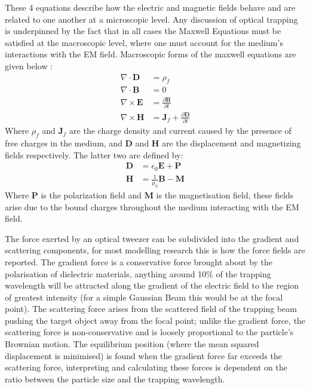 These 4 equations describe how the electric and magnetic fields behave and are related to one another at a microscopic level. Any discussion of optical trapping is underpinned by the fact that in all cases the Maxwell Equations must be satisfied at the macroscopic level, where one must account for the medium's interactions with the EM field. Macroscopic forms of the maxwell equations are given below \cite{Jackson_1975}:
\begin{align}
	\nabla \cdot \mathbf{D}
	&= \rho_f
	\\
	\nabla \cdot \mathbf{B}
	&= 0
	\\
	\nabla \times \mathbf{E}
	&= \frac{\partial \mathbf{B}}{\partial t}
	\\
	\nabla \times \mathbf{H}
	&= \mathbf{J}_f +\frac{\partial \mathbf{D}}{\partial t}  
\end{align}
Where $\rho_f$ and $\mathbf{J}_f$ are the charge density and current caused by the presence of free charges in the medium, and $\mathbf{D}$ and $\mathbf{H}$ are the displacement and magnetizing fields respectively. The latter two are defined by:
\begin{align}
	\nonumber
	\mathbf{D} &= \epsilon_0\mathbf{E}+\mathbf{P} 
	\\ 
	\nonumber
	\mathbf{H} &= \frac{1}{\mu_0}\mathbf{B}-\mathbf{M}
\end{align}
Where $\mathbf{P}$ is the polarization field and $\mathbf{M}$ is the magnetisation field, these fields arise due to the bound charges throughout the medium interacting with the EM field. 
 
The force exerted by an optical tweezer can be subdivided into the gradient and scattering components, for most modelling research this is how the force fields are reported. The gradient force is a conservative force brought about by the polarisation of dielectric materials, anything around 10\% of the trapping wavelength will be attracted along the gradient of the electric field to the region of greatest intensity (for a simple Gaussian Beam this would be at the focal point). The scattering force arises from the scattered field of the trapping beam pushing the target object away from the focal point; unlike the gradient force, the scattering force is non-conservative and is loosely proportional to the particle's Brownian motion. The equilibrium position (where the mean squared displacement is minimised) is found when the gradient force far exceeds the scattering force, interpreting and calculating these forces is dependent on the ratio between the particle size and the trapping wavelength.


